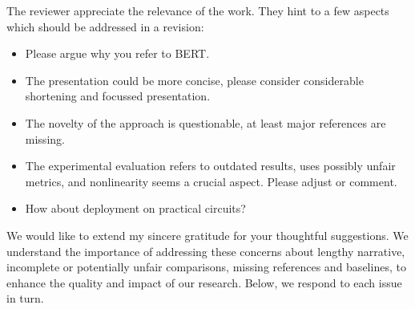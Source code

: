 \AssociateEditor
\begin{generalcomment}
The reviewer appreciate the relevance of the work. They hint to a few aspects which should be addressed in a revision:
\begin{itemize}
    \item Please argue why you refer to BERT. 
    \item The presentation could be more concise, please consider considerable shortening and focussed presentation. 
    \item The novelty of the approach is questionable, at least major references are missing. 
    \item The experimental evaluation refers to outdated results, uses possibly unfair metrics, and nonlinearity seems a crucial aspect. Please adjust or comment. 
    \item How about deployment on practical circuits?
\end{itemize}
\end{generalcomment}
\begin{revmeta}[]

We would like to extend my sincere gratitude for your thoughtful suggestions. We understand the importance of addressing these concerns about lengthy narrative, incomplete or potentially unfair comparisons, missing references and baselines, to enhance the quality and impact of our research. Below, we respond to each issue in turn.  
\end{revmeta}

